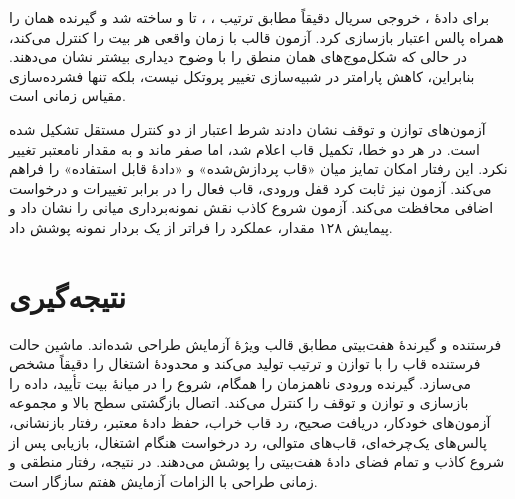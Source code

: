 برای دادهٔ ، خروجی سریال دقیقاً مطابق ترتیب ، ،
 تا  و  ساخته شد و گیرنده همان  را همراه پالس
اعتبار بازسازی کرد. آزمون قالب با  زمان واقعی هر بیت را کنترل می‌کند،
در حالی که شکل‌موج‌های  همان منطق را با وضوح دیداری بیشتر نشان
می‌دهند. بنابراین، کاهش پارامتر در شبیه‌سازی تغییر پروتکل نیست، بلکه تنها فشرده‌سازی مقیاس
زمانی است.

آزمون‌های توازن و توقف نشان دادند شرط اعتبار از دو کنترل مستقل تشکیل شده است. در هر دو
خطا، تکمیل قاب اعلام شد، اما  صفر ماند و  به مقدار
نامعتبر تغییر نکرد. این رفتار امکان تمایز میان «قاب پردازش‌شده» و «دادهٔ قابل استفاده» را
فراهم می‌کند. آزمون  نیز ثابت کرد قفل ورودی، قاب فعال را در برابر تغییرات
 و درخواست اضافی محافظت می‌کند. آزمون شروع کاذب نقش نمونه‌برداری میانی را
نشان داد و پیمایش ۱۲۸ مقدار، عملکرد را فراتر از یک بردار نمونه پوشش داد.


\section{نتیجه‌گیری}

فرستنده و گیرندهٔ  هفت‌بیتی مطابق قالب ویژهٔ آزمایش طراحی شده‌اند. ماشین حالت
فرستنده قاب را با توازن  و ترتیب  تولید می‌کند و 
محدودهٔ اشتغال را دقیقاً مشخص می‌سازد. گیرنده ورودی ناهمزمان را همگام، شروع را در میانهٔ
بیت تأیید، داده را بازسازی و توازن و توقف را کنترل می‌کند. اتصال بازگشتی سطح بالا و مجموعه
آزمون‌های خودکار، دریافت صحیح، رد قاب خراب، حفظ دادهٔ معتبر، رفتار بازنشانی، پالس‌های
یک‌چرخه‌ای، قاب‌های متوالی، رد درخواست هنگام اشتغال، بازیابی پس از شروع کاذب و تمام فضای
دادهٔ هفت‌بیتی را پوشش می‌دهند. در نتیجه، رفتار منطقی و زمانی طراحی با الزامات آزمایش هفتم
سازگار است.

